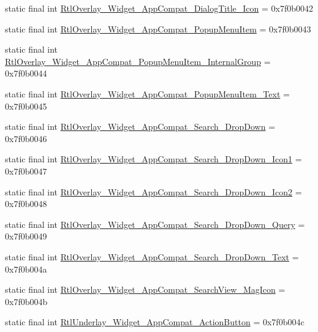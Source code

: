 \begin{CompactItemize}
\item 
static final int \hyperlink{classandroid_1_1support_1_1v7_1_1recyclerview_1_1_r_1_1style_f711f92f905954d81ba00b97f0572ea8}{RtlOverlay\_\-Widget\_\-AppCompat\_\-DialogTitle\_\-Icon} = 0x7f0b0042
\item 
static final int \hyperlink{classandroid_1_1support_1_1v7_1_1recyclerview_1_1_r_1_1style_767292ab11a837490ec054d469aed5b5}{RtlOverlay\_\-Widget\_\-AppCompat\_\-PopupMenuItem} = 0x7f0b0043
\item 
static final int \hyperlink{classandroid_1_1support_1_1v7_1_1recyclerview_1_1_r_1_1style_b89bd2de88efab26393be2fc8be5364b}{RtlOverlay\_\-Widget\_\-AppCompat\_\-PopupMenuItem\_\-InternalGroup} = 0x7f0b0044
\item 
static final int \hyperlink{classandroid_1_1support_1_1v7_1_1recyclerview_1_1_r_1_1style_76d43296e995a261efec0b9d9f8530f5}{RtlOverlay\_\-Widget\_\-AppCompat\_\-PopupMenuItem\_\-Text} = 0x7f0b0045
\item 
static final int \hyperlink{classandroid_1_1support_1_1v7_1_1recyclerview_1_1_r_1_1style_5240a7c4a1ded7f24bd705f34097d7fb}{RtlOverlay\_\-Widget\_\-AppCompat\_\-Search\_\-DropDown} = 0x7f0b0046
\item 
static final int \hyperlink{classandroid_1_1support_1_1v7_1_1recyclerview_1_1_r_1_1style_6e2b28d896baa95a4cb9e3948ab719d5}{RtlOverlay\_\-Widget\_\-AppCompat\_\-Search\_\-DropDown\_\-Icon1} = 0x7f0b0047
\item 
static final int \hyperlink{classandroid_1_1support_1_1v7_1_1recyclerview_1_1_r_1_1style_7b39394ec635f59e22754ca120ca728b}{RtlOverlay\_\-Widget\_\-AppCompat\_\-Search\_\-DropDown\_\-Icon2} = 0x7f0b0048
\item 
static final int \hyperlink{classandroid_1_1support_1_1v7_1_1recyclerview_1_1_r_1_1style_d8f00e5187f2cab6aa488a1152d467fa}{RtlOverlay\_\-Widget\_\-AppCompat\_\-Search\_\-DropDown\_\-Query} = 0x7f0b0049
\item 
static final int \hyperlink{classandroid_1_1support_1_1v7_1_1recyclerview_1_1_r_1_1style_dc335bf4ce992e63e3b305324d10469a}{RtlOverlay\_\-Widget\_\-AppCompat\_\-Search\_\-DropDown\_\-Text} = 0x7f0b004a
\item 
static final int \hyperlink{classandroid_1_1support_1_1v7_1_1recyclerview_1_1_r_1_1style_89ad70b527191431631f7d3749b5b78a}{RtlOverlay\_\-Widget\_\-AppCompat\_\-SearchView\_\-MagIcon} = 0x7f0b004b
\item 
static final int \hyperlink{classandroid_1_1support_1_1v7_1_1recyclerview_1_1_r_1_1style_f7a1fbc0386a81eea7f9c74d95b15a0a}{RtlUnderlay\_\-Widget\_\-AppCompat\_\-ActionButton} = 0x7f0b004c

\end{CompactItemize}
